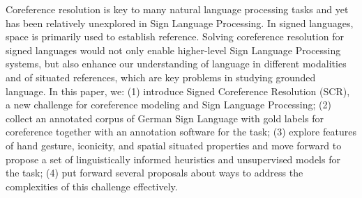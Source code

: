 Coreference resolution is key to many natural language processing tasks and yet has  been relatively unexplored in Sign Language Processing. In signed languages, space is primarily used to establish reference. Solving coreference resolution for signed languages would not only enable higher-level Sign Language Processing systems, but also enhance our understanding of language in different modalities and of situated references, which are key problems in studying grounded language. In this paper, we: (1) introduce Signed Coreference Resolution (SCR), a new challenge for coreference modeling and Sign Language Processing; (2) collect an annotated corpus of German Sign Language with gold labels for coreference together with an annotation software for the task; (3) explore features of hand gesture, iconicity, and spatial situated properties and move forward to propose a set of linguistically informed heuristics and unsupervised models for the task; (4) put forward several proposals about ways to address the complexities of this challenge effectively.
